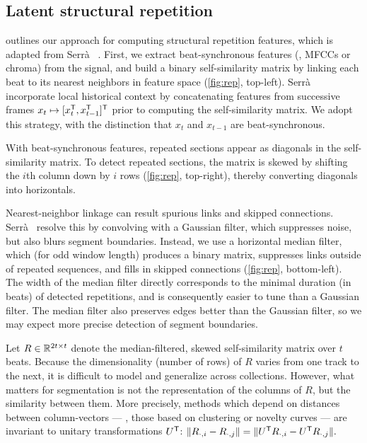 \documentclass{article}
\begin{document}
\subsection{Latent structural repetition}
 outlines our approach for computing structural repetition features, which is adapted from
Serr\`{a} \etal~\cite{serra2012unsupervised}.  First, we extract beat-synchronous features (\eg, MFCCs or chroma) 
from the signal, and build a binary self-similarity matrix by linking each beat to its nearest neighbors in feature
space (\cref{fig:rep}, top-left).
Serr\`{a}~\etal{} incorporate local historical context by concatenating features from successive frames ${x_t \mapsto [x_t^\mathsf{T}, x_{t-1}^\mathsf{T}]^\mathsf{T}}$ prior 
to computing the self-similarity matrix.  We adopt this strategy, with the distinction that $x_{t}$ and $x_{t-1}$ are beat-synchronous.

With beat-synchronous features, repeated sections appear as diagonals in the self-similarity
matrix. To detect repeated sections, the matrix is skewed by shifting the $i$th column down by $i$ rows
(\cref{fig:rep}, top-right), thereby converting diagonals into horizontals.

Nearest-neighbor linkage can result spurious links and skipped connections. 
Serr\`{a}~\etal{} resolve this by convolving with a Gaussian filter, which suppresses noise, but also blurs
segment boundaries. Instead, we use a horizontal median filter, which (for odd window length) produces a binary matrix,
suppresses links outside of repeated sequences, and fills in skipped connections (\cref{fig:rep},
bottom-left).  The width of the median filter directly corresponds to the minimal duration (in beats) of detected repetitions,
and is consequently easier to tune than a Gaussian filter.
The median filter also preserves edges better than the Gaussian filter, so we may expect more precise detection of segment boundaries.

Let $R \in \mathbb{R}^{2t \times t}$ denote the median-filtered, skewed self-similarity matrix over $t$ beats.  
Because the dimensionality (number of rows) of $R$ varies from one track to the next,
it is difficult to model and generalize across collections.
However, what matters for segmentation is not the representation of the columns of $R$, but the similarity between them.
More precisely, methods which depend on distances between column-vectors --- \ie, those based on clustering or novelty curves --- 
are invariant to unitary transformations $U^\mathsf{T}$:
$
\|R_{\cdot, i} - R_{\cdot, j}\| = \|U^\mathsf{T} R_{\cdot, i} - U^\mathsf{T} R_{\cdot, j}\|.
$ 
\end{document}
